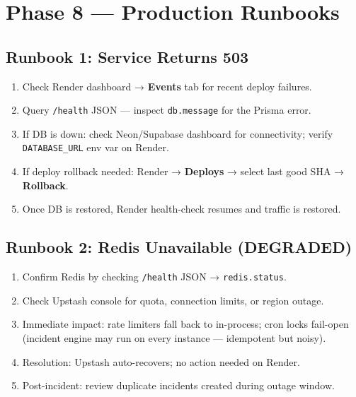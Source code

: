 \documentclass[12pt,a4paper]{article}
\begin{document}
\newpage

\section{Phase 8 — Production Runbooks}

\subsection{Runbook 1: Service Returns 503}

\begin{tcolorbox}[colback=crit!5,colframe=crit,title=\textbf{Trigger: /health returns 503 DOWN}]
\begin{enumerate}[leftmargin=*,nosep]
  \item Check Render dashboard → \textbf{Events} tab for recent deploy failures.
  \item Query \texttt{/health} JSON — inspect \texttt{db.message} for the Prisma error.
  \item If DB is down: check Neon/Supabase dashboard for connectivity; verify
        \texttt{DATABASE\_URL} env var on Render.
  \item If deploy rollback needed: Render → \textbf{Deploys} → select last good SHA
        → \textbf{Rollback}.
  \item Once DB is restored, Render health-check resumes and traffic is restored.
\end{enumerate}
\end{tcolorbox}

\subsection{Runbook 2: Redis Unavailable (DEGRADED)}

\begin{tcolorbox}[colback=warn!8,colframe=warn,title=\textbf{Trigger: /health returns DEGRADED}]
\begin{enumerate}[leftmargin=*,nosep]
  \item Confirm Redis by checking \texttt{/health} JSON → \texttt{redis.status}.
  \item Check Upstash console for quota, connection limits, or region outage.
  \item Immediate impact: rate limiters fall back to in-process; cron locks fail-open
        (incident engine may run on every instance — idempotent but noisy).
  \item Resolution: Upstash auto-recovers; no action needed on Render.
  \item Post-incident: review duplicate incidents created during outage window.
\end{enumerate}
\end{tcolorbox}
\end{document}
